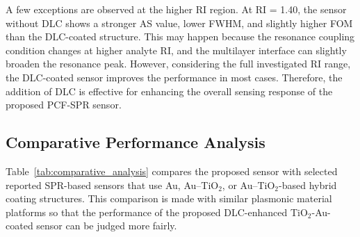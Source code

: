\documentclass[preprint,12pt]{elsarticle}
\begin{document}
A few exceptions are observed at the higher RI region. At RI = 1.40, the sensor without DLC shows a stronger AS value, lower FWHM, and slightly higher FOM than the DLC-coated structure. This may happen because the resonance coupling condition changes at higher analyte RI, and the multilayer interface can slightly broaden the resonance peak. However, considering the full investigated RI range, the DLC-coated sensor improves the performance in most cases. Therefore, the addition of DLC is effective for enhancing the overall sensing response of the proposed PCF-SPR sensor.

\subsection{\textbf{{Comparative Performance Analysis}}}

Table~\ref{tab:comparative_analysis} compares the proposed sensor with selected reported SPR-based sensors that use Au, Au--TiO$_2$, or Au--TiO$_2$-based hybrid coating structures. This comparison is made with similar plasmonic material platforms so that the performance of the proposed DLC-enhanced TiO$_2$-Au-coated sensor can be judged more fairly.
\end{document}
